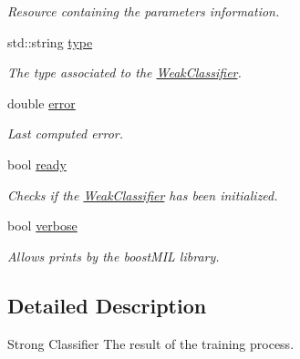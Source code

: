 \begin{DoxyCompactItemize}
\begin{DoxyCompactList}\small\item\em Resource containing the parameters information. \end{DoxyCompactList}\item 
std\+::string \hyperlink{classiCub_1_1boostMIL_1_1WeakClassifier_a6e08c26ea2e12086317d6cdd0f65bbd9}{type}\label{classiCub_1_1boostMIL_1_1WeakClassifier_a6e08c26ea2e12086317d6cdd0f65bbd9}

\begin{DoxyCompactList}\small\item\em The type associated to the \hyperlink{classiCub_1_1boostMIL_1_1WeakClassifier}{Weak\+Classifier}. \end{DoxyCompactList}\item 
double \hyperlink{classiCub_1_1boostMIL_1_1WeakClassifier_afa9e7bb9b9a92d349b40a4f127386a59}{error}\label{classiCub_1_1boostMIL_1_1WeakClassifier_afa9e7bb9b9a92d349b40a4f127386a59}

\begin{DoxyCompactList}\small\item\em Last computed error. \end{DoxyCompactList}\item 
bool \hyperlink{classiCub_1_1boostMIL_1_1WeakClassifier_a7fe5fe3366a82def4031c16a9a278350}{ready}\label{classiCub_1_1boostMIL_1_1WeakClassifier_a7fe5fe3366a82def4031c16a9a278350}

\begin{DoxyCompactList}\small\item\em Checks if the \hyperlink{classiCub_1_1boostMIL_1_1WeakClassifier}{Weak\+Classifier} has been initialized. \end{DoxyCompactList}\item 
bool \hyperlink{classiCub_1_1boostMIL_1_1WeakClassifier_a63a5602437f6936da17e33ca4d89976a}{verbose}\label{classiCub_1_1boostMIL_1_1WeakClassifier_a63a5602437f6936da17e33ca4d89976a}

\begin{DoxyCompactList}\small\item\em Allows prints by the boost\+M\+I\+L library. \end{DoxyCompactList}\end{DoxyCompactItemize}


\subsection{Detailed Description}
Strong Classifier The result of the training process. 

